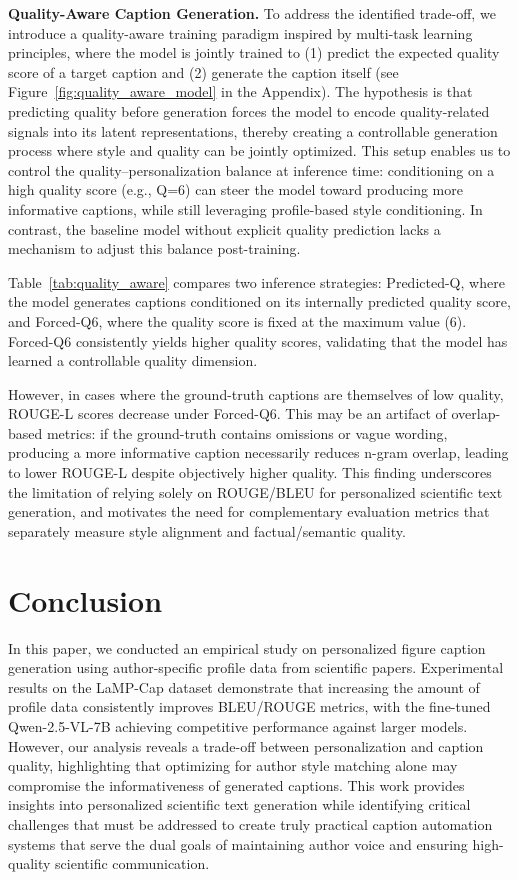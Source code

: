 \documentclass{article} %
\begin{document}
\noindent \textbf{Quality-Aware Caption Generation.} To address the identified trade-off, we introduce a quality-aware training paradigm inspired by multi-task learning principles, where the model is jointly trained to (1) predict the expected quality score of a target caption and (2) generate the caption itself (see Figure~\ref{fig:quality_aware_model} in the Appendix). The hypothesis is that predicting quality before generation forces the model to encode quality-related signals into its latent representations, thereby creating a controllable generation process where style and quality can be jointly optimized.
This setup enables us to control the quality–personalization balance at inference time: conditioning on a high quality score (e.g., Q=6) can steer the model toward producing more informative captions, while still leveraging profile-based style conditioning. In contrast, the baseline model without explicit quality prediction lacks a mechanism to adjust this balance post-training.

Table~\ref{tab:quality_aware} compares two inference strategies: Predicted-Q, where the model generates captions conditioned on its internally predicted quality score, and Forced-Q6, where the quality score is fixed at the maximum value (6). Forced-Q6 consistently yields higher quality scores, validating that the model has learned a controllable quality dimension. 

However, in cases where the ground-truth captions are themselves of low quality, ROUGE-L scores decrease under Forced-Q6. This may be an artifact of overlap-based metrics: if the ground-truth contains omissions or vague wording, producing a more informative caption necessarily reduces n-gram overlap, leading to lower ROUGE-L despite objectively higher quality. This finding underscores the limitation of relying solely on ROUGE/BLEU for personalized scientific text generation, and motivates the need for complementary evaluation metrics that separately measure style alignment and factual/semantic quality.


\section{Conclusion} 
In this paper, we conducted an empirical study on personalized figure caption generation using author-specific profile data from scientific papers. Experimental results on the LaMP-Cap dataset demonstrate that increasing the amount of profile data consistently improves BLEU/ROUGE metrics, with the fine-tuned Qwen-2.5-VL-7B achieving competitive performance against larger models. However, our analysis reveals a trade-off between personalization and caption quality, highlighting that optimizing for author style matching alone may compromise the informativeness of generated captions. This work provides insights into personalized scientific text generation while identifying critical challenges that must be addressed to create truly practical caption automation systems that serve the dual goals of maintaining author voice and ensuring high-quality scientific communication.
\end{document}
